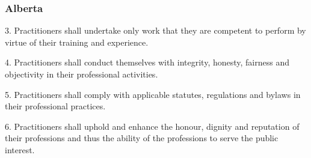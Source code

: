 \begin{frame}
\frametitle{Alberta}

3. Practitioners shall undertake only work that they are competent to perform by virtue of their training and experience.

4. Practitioners shall conduct themselves with integrity, honesty, fairness and objectivity in their professional activities.

5. Practitioners shall comply with applicable statutes, regulations and bylaws in their professional practices.

6. Practitioners shall uphold and enhance the honour, dignity and reputation of their professions and thus the ability of the professions to serve the public interest.

\end{frame}




